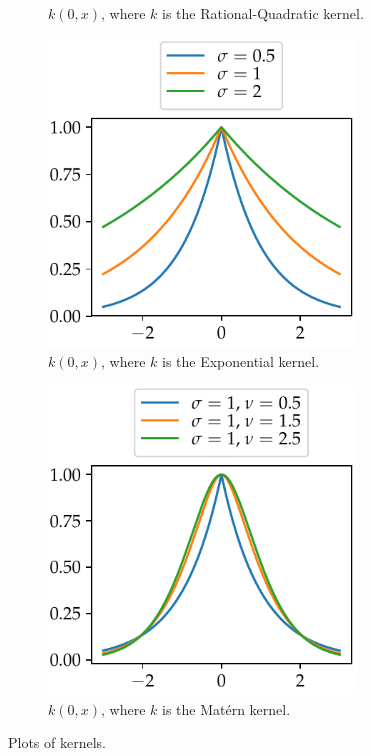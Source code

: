 \documentclass[11pt,twoside,openright]{report}
\begin{document}
\begin{figure}
\begin{subfigure}{0.5\textwidth}
    \caption{$k(0, x)$, where $k$ is the Rational-Quadratic kernel.}
    \label{fig:rational_quadratic_kernel}
  \end{subfigure}
  \begin{subfigure}{0.5\textwidth}
    \centering
    \includegraphics[width=0.9\textwidth]{exponential_kernel_plot.pdf}
    \caption{$k(0, x)$, where $k$ is the Exponential kernel.}
    \label{fig:exponential_kernel}
  \end{subfigure}%
  \begin{subfigure}{0.5\textwidth}
    \centering
    \includegraphics[width=0.9\textwidth]{matern_kernel_plot.pdf}
    \caption{$k(0, x)$, where $k$ is the Mat\'ern kernel.}
    \label{fig:matern_kernel}
  \end{subfigure}
  \caption{Plots of kernels.}
\end{figure}
\end{document}
